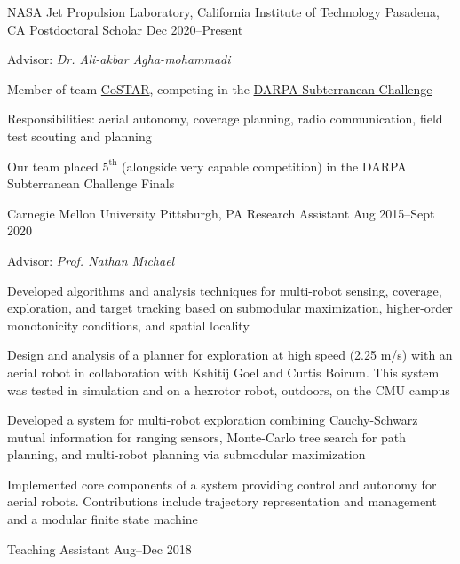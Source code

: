 
\begin{cventries}
  \cventry
  {NASA Jet Propulsion Laboratory, California Institute of Technology}
  {Pasadena, CA}
  {Postdoctoral Scholar}
  {Dec 2020--Present}
  {
    \begin{cvitems}
    \item Advisor: \emph{Dr. Ali-akbar Agha-mohammadi}
    \item Member of team \href{https://costar.jpl.nasa.gov/}{CoSTAR}, competing in the
      \href{https://www.subtchallenge.com/}{DARPA Subterranean Challenge}
    \item Responsibilities:
      aerial autonomy, coverage planning, radio communication,
      field test scouting and planning
    \item Our team placed $5^\mathrm{th}$ (alongside very capable competition)
      in the DARPA Subterranean Challenge Finals
    \end{cvitems}
  }
  \cventrytwo
  {Carnegie Mellon University}
  {Pittsburgh, PA}
  {Research Assistant}
  {Aug 2015--Sept 2020}
  {
    \begin{cvitems} %
    \item Advisor: \emph{Prof. Nathan Michael}
    \item Developed algorithms and analysis techniques for multi-robot sensing,
      coverage, exploration, and target tracking based on submodular
      maximization, higher-order monotonicity conditions, and spatial locality
    \item Design and analysis of a planner for exploration at high speed (2.25
      m/s) with an aerial robot in collaboration with Kshitij Goel and Curtis
      Boirum.
      This system was tested in simulation and on a hexrotor robot, outdoors, on
      the CMU campus
    \item Developed a system for multi-robot exploration combining Cauchy-Schwarz
      mutual information for ranging sensors, Monte-Carlo tree search for path
      planning, and multi-robot planning via submodular maximization
    \item Implemented core components of a system providing control and autonomy
      for aerial robots.
      Contributions include trajectory representation and management and a
      modular finite state machine
    \end{cvitems}
  }
  {Teaching Assistant}
  {Aug--Dec 2018}
  {
    \begin{cvitems} %

\end{cvitems}}
\end{cventries}
